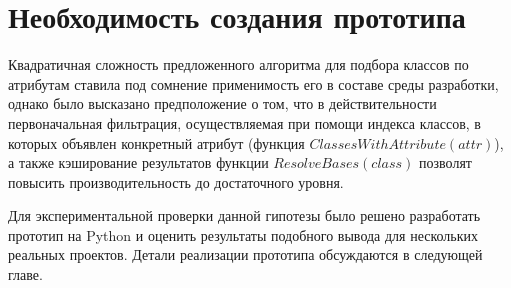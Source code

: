 \section{Необходимость создания прототипа}
\label{sec:prototype-necessity}

Квадратичная сложность предложенного алгоритма для подбора классов по атрибутам
ставила под сомнение применимость его в составе среды разработки, однако было
высказано предположение о том, что в действительности первоначальная фильтрация,
осуществляемая при помощи индекса классов, в которых объявлен конкретный
атрибут (функция $ClassesWithAttribute(attr)$), а также кэширование результатов
функции $ResolveBases(class)$ позволят повысить производительность до
достаточного уровня.

Для экспериментальной проверки данной гипотезы было решено разработать прототип
на Python и оценить результаты подобного вывода для нескольких реальных
проектов. Детали реализации прототипа обсуждаются в следующей главе.






